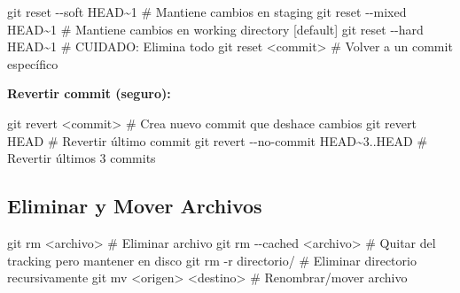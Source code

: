 \documentclass[
  doc,
  floatsintext,
  longtable,
  a4paper,
  nolmodern,
  notxfonts,
  notimes,
  12pt,
  colorlinks=true,linkcolor=blue,citecolor=blue,urlcolor=blue]{apa7}
\newenvironment{Shaded}{\begin{snugshade}}{\end{snugshade}}
\newcommand{\AttributeTok}[1]{\textcolor[rgb]{0.40,0.45,0.13}{#1}}
\newcommand{\CommentTok}[1]{\textcolor[rgb]{0.37,0.37,0.37}{#1}}
\newcommand{\FunctionTok}[1]{\textcolor[rgb]{0.28,0.35,0.67}{#1}}
\newcommand{\NormalTok}[1]{\textcolor[rgb]{0.00,0.23,0.31}{#1}}
\newcommand{\OperatorTok}[1]{\textcolor[rgb]{0.37,0.37,0.37}{#1}}
\begin{document}
\begin{Shaded}
\begin{Highlighting}[]
\FunctionTok{git}\NormalTok{ reset }\AttributeTok{{-}{-}soft}\NormalTok{ HEAD\textasciitilde{}1   }\CommentTok{\# Mantiene cambios en staging}
\FunctionTok{git}\NormalTok{ reset }\AttributeTok{{-}{-}mixed}\NormalTok{ HEAD\textasciitilde{}1  }\CommentTok{\# Mantiene cambios en working directory [default]}
\FunctionTok{git}\NormalTok{ reset }\AttributeTok{{-}{-}hard}\NormalTok{ HEAD\textasciitilde{}1   }\CommentTok{\# CUIDADO: Elimina todo}
\FunctionTok{git}\NormalTok{ reset }\OperatorTok{\textless{}}\NormalTok{commit}\OperatorTok{\textgreater{}}        \CommentTok{\# Volver a un commit específico}
\end{Highlighting}
\end{Shaded}

\textbf{Revertir commit (seguro):}

\begin{Shaded}
\begin{Highlighting}[]
\FunctionTok{git}\NormalTok{ revert }\OperatorTok{\textless{}}\NormalTok{commit}\OperatorTok{\textgreater{}}        \CommentTok{\# Crea nuevo commit que deshace cambios}
\FunctionTok{git}\NormalTok{ revert HEAD            }\CommentTok{\# Revertir último commit}
\FunctionTok{git}\NormalTok{ revert }\AttributeTok{{-}{-}no{-}commit}\NormalTok{ HEAD\textasciitilde{}3..HEAD  }\CommentTok{\# Revertir últimos 3 commits}
\end{Highlighting}
\end{Shaded}

\subsection{Eliminar y Mover Archivos}\label{eliminar-y-mover-archivos}

\begin{Shaded}
\begin{Highlighting}[]
\FunctionTok{git}\NormalTok{ rm }\OperatorTok{\textless{}}\NormalTok{archivo}\OperatorTok{\textgreater{}}           \CommentTok{\# Eliminar archivo}
\FunctionTok{git}\NormalTok{ rm }\AttributeTok{{-}{-}cached} \OperatorTok{\textless{}}\NormalTok{archivo}\OperatorTok{\textgreater{}}  \CommentTok{\# Quitar del tracking pero mantener en disco}
\FunctionTok{git}\NormalTok{ rm }\AttributeTok{{-}r}\NormalTok{ directorio/      }\CommentTok{\# Eliminar directorio recursivamente}
\FunctionTok{git}\NormalTok{ mv }\OperatorTok{\textless{}}\NormalTok{origen}\OperatorTok{\textgreater{}} \OperatorTok{\textless{}}\NormalTok{destino}\OperatorTok{\textgreater{}}  \CommentTok{\# Renombrar/mover archivo}
\end{Highlighting}
\end{Shaded}
\end{document}
